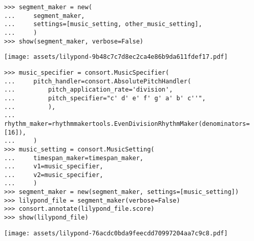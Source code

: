 \begin{comment}
<abjad>[stylesheet=../consort.ily]
segment_maker = new(
    segment_maker,
    settings=[music_setting, other_music_setting],
    )
show(segment_maker, verbose=False)
</abjad>
\end{comment}

\begin{abjadbookoutput}
\begin{singlespacing}
\vspace{-0.5\baselineskip}
\begin{lstlisting}
>>> segment_maker = new(
...     segment_maker,
...     settings=[music_setting, other_music_setting],
...     )
>>> show(segment_maker, verbose=False)
\end{lstlisting}
\noindent\texttt{[image: assets/lilypond-9b48c7c7d8ec2ca4e86b9da611fdef17.pdf]}
\end{singlespacing}
\end{abjadbookoutput}

\begin{comment}
<abjad>[stylesheet=../consort.ily]
music_specifier = consort.MusicSpecifier(
    pitch_handler=consort.AbsolutePitchHandler(
        pitch_application_rate='division',
        pitch_specifier="c' d' e' f' g' a' b' c''",
        ),
    rhythm_maker=rhythmmakertools.EvenDivisionRhythmMaker(denominators=[16]),
    )
music_setting = consort.MusicSetting(
    timespan_maker=timespan_maker,
    v1=music_specifier,
    v2=music_specifier,
    )
segment_maker = new(segment_maker, settings=[music_setting])
lilypond_file = segment_maker(verbose=False)
consort.annotate(lilypond_file.score)
show(lilypond_file)
</abjad>
\end{comment}

\begin{abjadbookoutput}
\begin{singlespacing}
\vspace{-0.5\baselineskip}
\begin{lstlisting}
>>> music_specifier = consort.MusicSpecifier(
...     pitch_handler=consort.AbsolutePitchHandler(
...         pitch_application_rate='division',
...         pitch_specifier="c' d' e' f' g' a' b' c''",
...         ),
...     rhythm_maker=rhythmmakertools.EvenDivisionRhythmMaker(denominators=[16]),
...     )
>>> music_setting = consort.MusicSetting(
...     timespan_maker=timespan_maker,
...     v1=music_specifier,
...     v2=music_specifier,
...     )
>>> segment_maker = new(segment_maker, settings=[music_setting])
>>> lilypond_file = segment_maker(verbose=False)
>>> consort.annotate(lilypond_file.score)
>>> show(lilypond_file)
\end{lstlisting}
\noindent\texttt{[image: assets/lilypond-76acdc0bda9feecdd70997204aa7c9c8.pdf]}
\end{singlespacing}
\end{abjadbookoutput}

